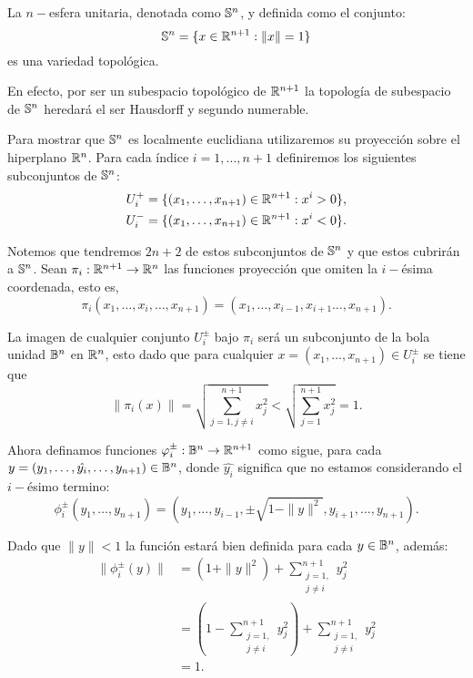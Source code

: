 \begin{example}[$n-$Esfera]\label{Ex: Variedad Topologica - Esfera}
	La $n-$esfera unitaria, denotada como $\S^n$, y definida como el conjunto:
	\[
		\S^n = \{x \in \R^{n+1}: \| x \| = 1 \}
	\]
	es una variedad topológica.

	En efecto, por ser un subespacio topológico de $\R^{n+1}$ la topología de subespacio de $\S^n$ heredará el ser Hausdorff y segundo numerable.

	Para mostrar que $\S^n$ es localmente euclidiana utilizaremos su proyección sobre el hiperplano $\R^{n}$. Para cada índice $i=1, \hdots, n+1$ definiremos los siguientes subconjuntos de $\S^n$:
	\begin{align*}
		U_{i}^{+} & = \{(x_1,\hdots,x_{n+1}) \in \R^{n+1}: x^i > 0\}, \\
		U_{i}^{-} & = \{(x_1,\hdots,x_{n+1}) \in \R^{n+1}: x^i < 0\}.
	\end{align*}

	Notemos que tendremos $2n + 2$ de estos subconjuntos de $\S^n$ y que estos cubrirán a $\S^n$. Sean $\pi_i: \R^{n+1} \to \R^n$ las funciones proyección que omiten la $i-$ésima coordenada, esto es,
	\[
		\pi_i(x_1,\hdots,x_i,\hdots,x_{n+1}) = (x_1,\hdots,x_{i-1},x_{i+1}\hdots,x_{n+1}).
	\]

	La imagen de cualquier conjunto $U_{i}^{\pm}$ bajo $\pi_i$ será un subconjunto de la bola unidad $\B^n$ en $\R^n$, esto dado que para cualquier $x=(x_1, \hdots, x_{n+1}) \in U_{i}^{\pm}$ se tiene que
	\[
		\|\pi_i(x)\| = \sqrt{\sum_{j=1, j\neq i}^{n+1} x_j^2} < \sqrt{\sum_{j=1}^{n+1} x_j^2} = 1.
	\]

  Ahora definamos funciones $\phi_i^{\pm}: \B^n \to \R^{n+1}$ como sigue, para cada $y=(y_1, \dots, \hat{y_i}, \dots, y_{n+1}) \in \B^n$, donde $\hat{y_i}$ significa que no estamos considerando el $i-$ésimo termino:
	\[
    \phi_{i}^{\pm}(y_1, \hdots, y_{n+1}) =  (y_1, \hdots, y_{i-1}, \pm\sqrt{1 - \|y\|^2}, y_{i+1}, \hdots, y_{n+1}).
	\]

	Dado que $\|y\| < 1$ la función estará bien definida para cada $y \in \B^n$, además:
	\begin{align*}
		\|\phi_i^{\pm}(y)\| & = (1 + \| y \|^{2}) + \sum_{\substack{j=1, \\ j \neq i}}^{n+1} y_j^2 \\
		                    & = \left(
		1 - \sum_{\substack{j=1,                                         \\ j \neq i}}^{n+1} y_j^2
		\right) + \sum_{\substack{j=1,                                   \\ j \neq i}}^{n+1} y_j^2 \\
		                    & = 1.
	\end{align*}


\end{example}
